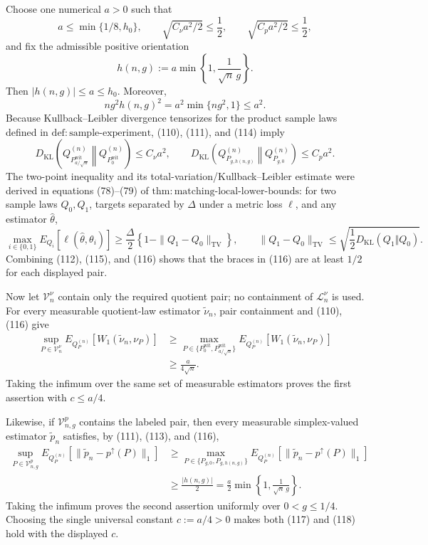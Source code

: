 Choose one numerical \(a>0\) such that
\[
a\le \min\{1/8,h_0\},
\qquad
\sqrt{C_{\nu}a^2/2}\le\frac12,
\qquad
\sqrt{C_pa^2/2}\le\frac12,                                             \tag{112}
\]
and fix the admissible positive orientation
\[
h(n,g):=a\min\left\{1,\frac1{\sqrt n\,g}\right\}.                       \tag{113}
\]
Then \(|h(n,g)|\le a\le h_0\).  Moreover,
\[
ng^2h(n,g)^2
=a^2\min\{ng^2,1\}\le a^2.                                             \tag{114}
\]
Because Kullback--Leibler divergence tensorizes for the product sample laws defined in \(\mathrm{def:sample\text{-}experiment}\), (110), (111), and (114) imply
\[
D_{\mathrm{KL}}\!\left(Q_{P_{a/\sqrt n}^{\mathrm{wit}}}^{(n)}
 \middle\Vert Q_{P_0^{\mathrm{wit}}}^{(n)}\right)\le C_{\nu}a^2,
\qquad
D_{\mathrm{KL}}\!\left(Q_{P_{g,h(n,g)}}^{(n)}
 \middle\Vert Q_{P_{g,0}}^{(n)}\right)\le C_pa^2.                        \tag{115}
\]
The two-point inequality and its total-variation/Kullback--Leibler estimate were derived in equations (78)--(79) of \(\mathrm{thm:matching\text{-}local\text{-}lower\text{-}bounds}\): for two sample laws \(Q_0,Q_1\), targets separated by \(\Delta\) under a metric loss \(\ell\), and any estimator \(\widehat\theta\),
\[
\max_{i\in\{0,1\}}E_{Q_i}\!\left[\ell(\widehat\theta,\theta_i)\right]
\ge \frac{\Delta}{2}\left\{1-\|Q_1-Q_0\|_{\mathrm{TV}}\right\},
\qquad
\|Q_1-Q_0\|_{\mathrm{TV}}
\le\sqrt{\frac12D_{\mathrm{KL}}(Q_1\Vert Q_0)}.                         \tag{116}
\]
Combining (112), (115), and (116) shows that the braces in (116) are at least \(1/2\) for each displayed pair.

Now let \(\mathcal V_n^\nu\) contain only the required quotient pair; no containment of \(\mathcal L_n^\nu\) is used.  For every measurable quotient-law estimator \(\widetilde\nu_n\), pair containment and (110), (116) give
\[
\begin{aligned}
\sup_{P\in\mathcal V_n^\nu}
 E_{Q_P^{(n)}}\!\left[W_1(\widetilde\nu_n,\nu_P)\right]
&\ge
\max_{P\in\{P_0^{\mathrm{wit}},P_{a/\sqrt n}^{\mathrm{wit}}\}}
 E_{Q_P^{(n)}}\!\left[W_1(\widetilde\nu_n,\nu_P)\right]\\
&\ge \frac{a}{4\sqrt n}.                                                  \tag{117}
\end{aligned}
\]
Taking the infimum over the same set of measurable estimators proves the first assertion with \(c\le a/4\).

Likewise, if \(\mathcal V_{n,g}^p\) contains the labeled pair, then every measurable simplex-valued estimator \(\widetilde p_n\) satisfies, by (111), (113), and (116),
\[
\begin{aligned}
\sup_{P\in\mathcal V_{n,g}^p}
 E_{Q_P^{(n)}}\!\left[
 \|\widetilde p_n-p^{\uparrow}(P)\|_1\right]
&\ge
\max_{P\in\{P_{g,0},P_{g,h(n,g)}\}}
 E_{Q_P^{(n)}}\!\left[
 \|\widetilde p_n-p^{\uparrow}(P)\|_1\right]\\
&\ge \frac{|h(n,g)|}{2}
=\frac a2\min\left\{1,\frac1{\sqrt n\,g}\right\}.                    \tag{118}
\end{aligned}
\]
Taking the infimum proves the second assertion uniformly over \(0<g\le1/4\).  Choosing the single universal constant \(c:=a/4>0\) makes both (117) and (118) hold with the displayed \(c\).

